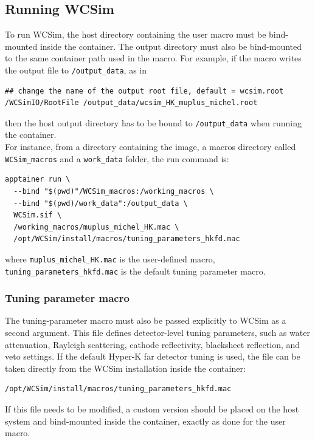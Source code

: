 \documentclass{article}
\numberwithin{table}{subsection}
\numberwithin{figure}{subsection}
\numberwithin{equation}{subsection}
\numberwithin{footnote}{subsection}
\begin{document}
\subsection{Running WCSim}
\label{subsec:running_wcsim}
To run WCSim, the host directory containing the user macro must be bind-mounted inside the container. The output directory must also be bind-mounted to the same container path used in the macro. For example, if the macro writes the output file to \texttt{/output\_data}, as in
\begin{lstlisting}[style=defstyle]
## change the name of the output root file, default = wcsim.root
/WCSimIO/RootFile /output_data/wcsim_HK_muplus_michel.root
\end{lstlisting}
then the host output directory has to be bound to \texttt{/output\_data} when running the container.\\
For instance, from a directory containing the image, a macros directory called \texttt{WCSim\_macros} and a \texttt{work\_data} folder, the run command is:
\begin{lstlisting}[style=terminal]
apptainer run \
  --bind "$(pwd)"/WCSim_macros:/working_macros \
  --bind "$(pwd)/work_data":/output_data \
  WCSim.sif \
  /working_macros/muplus_michel_HK.mac \
  /opt/WCSim/install/macros/tuning_parameters_hkfd.mac
\end{lstlisting}
where \texttt{muplus\_michel\_HK.mac} is the user-defined macro, \texttt{tuning\_parameters\_hkfd.mac} is the default tuning parameter macro.
\subsubsection{Tuning parameter macro}
The tuning-parameter macro must also be passed explicitly to WCSim as a second argument. This file defines detector-level tuning parameters, such as water attenuation, Rayleigh scattering, cathode reflectivity, blacksheet reflection, and veto settings. If the default Hyper-K far detector tuning is used, the file can be taken directly from the WCSim installation inside the container:
\begin{lstlisting}[style=defstyle]
/opt/WCSim/install/macros/tuning_parameters_hkfd.mac
\end{lstlisting}
If this file needs to be modified, a custom version should be placed on the host system and bind-mounted inside the container, exactly as done for the user macro.
\end{document}
